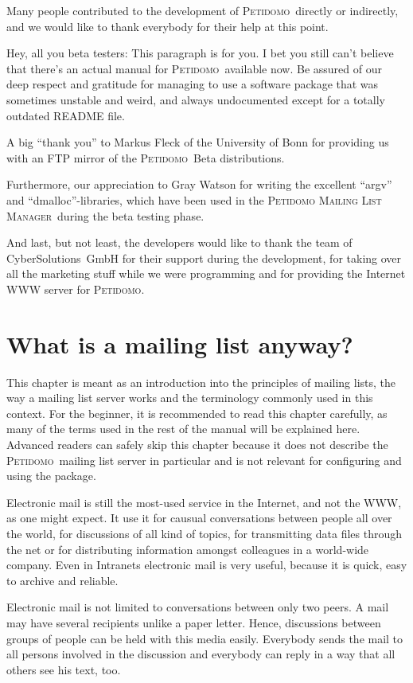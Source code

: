 \documentclass[a4paper]{report}
\newcommand{\PetidomoM}{{\scshape Peti\-domo Mail\-ing List Ma\-nager}}
\newcommand{\Petidomo}{{\scshape Peti\-domo}}
\begin{document}
Many people contributed to the development of \Petidomo\ directly or
indirectly, and we would like to thank everybody for their help at
this point.

Hey, all you beta testers: This paragraph is for you. I bet you still
can't believe that there's an actual manual for \Petidomo\ available
now. Be assured of our deep respect and gratitude for managing to use
a software package that was sometimes unstable and weird, and always
undocumented except for a totally outdated README file.

A big ``thank you'' to Markus Fleck of the University of Bonn for
providing us with an FTP mirror of the \Petidomo\ Beta distributions.

Furthermore, our appreciation to Gray Watson for writing the excellent
``argv'' and ``dmalloc''-libraries, which have been used in the
\PetidomoM\ during the beta testing phase.

And last, but not least, the developers would like to thank the team
of CyberSolutions~GmbH for their support during the development,
for taking over all the marketing stuff while we were programming and
for providing the Internet WWW server for \Petidomo.

\chapter{What is a mailing list anyway?}

This chapter is meant as an introduction into the principles of
mailing lists, the way a mailing list server works and the terminology
commonly used in this context. For the beginner, it is recommended to
read this chapter carefully, as many of the terms used in the rest of
the manual will be explained here. Advanced readers can safely skip
this chapter because it does not describe the \Petidomo\ mailing list
server in particular and is not relevant for configuring and using the
package.

\bigskip

Electronic mail is still the most-used service in the Internet, and
not the WWW, as one might expect. It use it for causual conversations
between people all over the world, for discussions of all kind of
topics, for transmitting data files through the net or for
distributing information amongst colleagues in a world-wide company.
Even in Intranets electronic mail is very useful, because it is quick,
easy to archive and reliable.

Electronic mail is not limited to conversations between only two
peers. A mail may have several recipients unlike a paper letter.
Hence, discussions between groups of people can be held with this
media easily. Everybody sends the mail to all persons involved in the
discussion and everybody can reply in a way that all others see his
text, too.
\end{document}
